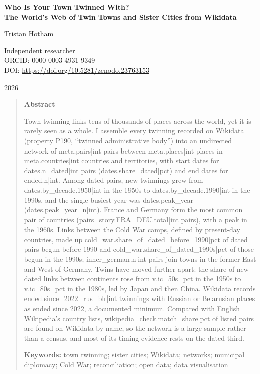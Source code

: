 \documentclass[11pt,a4paper]{article}
\begin{document}
\begin{center}
{\Large\bfseries Who Is Your Town Twinned With?\\[2pt] The World's Web of Twin Towns and Sister Cities from Wikidata\par}
\vspace{1.2em}
{\large Tristan Hotham\par}
\vspace{0.3em}
{\small Independent researcher\\
ORCID: 0000-0003-4931-9349\\
DOI: \href{https://doi.org/10.5281/zenodo.23763153}{https://doi.org/10.5281/zenodo.23763153}\par}
\vspace{0.8em}
2026
\end{center}

\begin{quote}
\small
\begin{center}\textbf{Abstract}\end{center}
Town twinning links tens of thousands of places across the world, yet it is rarely seen as a whole. I assemble every twinning recorded on Wikidata (property P190, ``twinned administrative body'') into an undirected network of {{meta.pairs|int}} pairs between {{meta.places|int}} places in {{meta.countries|int}} countries and territories, with start dates for {{dates.n_dated|int}} pairs ({{dates.share_dated|pct}}) and end dates for {{ended.n|int}}. Among dated pairs, new twinnings grew from {{dates.by_decade.1950|int}} in the 1950s to {{dates.by_decade.1990|int}} in the 1990s, and the single busiest year was {{dates.peak_year}} ({{dates.peak_year_n|int}}). France and Germany form the most common pair of countries ({{pairs_story.FRA_DEU.total|int}} pairs), with a peak in the 1960s. Links between the Cold War camps, defined by present-day countries, made up {{cold_war.share_of_dated_before_1990|pct}} of dated pairs begun before 1990 and {{cold_war.share_of_dated_1990s|pct}} of those begun in the 1990s; {{inner_german.n|int}} pairs join towns in the former East and West of Germany. Twins have moved further apart: the share of new dated links between continents rose from {{v.ic_50s_pct}} in the 1950s to {{v.ic_80s_pct}} in the 1980s, led by Japan and then China. Wikidata records {{ended.since_2022_rus_blr|int}} twinnings with Russian or Belarusian places as ended since 2022, a documented minimum. Compared with English Wikipedia's country lists, {{wikipedia_check.match_share|pct}} of listed pairs are found on Wikidata by name, so the network is a large sample rather than a census, and most of its timing evidence rests on the dated third.

\textbf{Keywords:} town twinning; sister cities; Wikidata; networks; municipal diplomacy; Cold War; reconciliation; open data; data visualisation
\end{quote}
\end{document}
